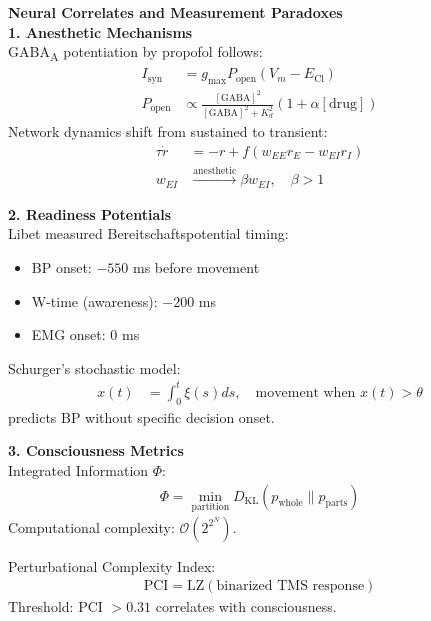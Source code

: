 \begin{technical}
    {\Large\textbf{Neural Correlates and Measurement Paradoxes}}\\[0.7em]

    \textbf{1. Anesthetic Mechanisms}\\[0.3em]
    GABA\textsubscript{A} potentiation by propofol follows:
    \begin{align*}
        I_\text{syn} &= g_\text{max} P_\text{open}(V_m - E_\text{Cl})\\
        P_\text{open} &\propto \frac{[\text{GABA}]^2}{[\text{GABA}]^2 + K_d^2}(1 + \alpha[\text{drug}])
    \end{align*}
    Network dynamics shift from sustained to transient:
    \begin{align*}
        \tau \dot{r} &= -r + f(w_{EE}r_E - w_{EI}r_I)\\
        w_{EI} &\xrightarrow{\text{anesthetic}} \beta w_{EI}, \quad \beta > 1
    \end{align*}

    \textbf{2. Readiness Potentials}\\[0.3em]
    Libet measured Bereitschaftspotential timing:
    \begin{itemize}
        \item BP onset: $-550$ ms before movement
        \item W-time (awareness): $-200$ ms
        \item EMG onset: $0$ ms
    \end{itemize}
    Schurger's stochastic model:
    \begin{align*}
        x(t) &= \int_0^t \xi(s)ds, \quad \text{movement when } x(t) > \theta
    \end{align*}
    predicts BP without specific decision onset.

    \textbf{3. Consciousness Metrics}\\[0.3em]
    Integrated Information $\Phi$:
    \begin{align*}
        \Phi = \min_{\text{partition}} D_\text{KL}(p_\text{whole} \| p_\text{parts})
    \end{align*}
    Computational complexity: $\mathcal{O}(2^{2^N})$.
    
    Perturbational Complexity Index:
    \begin{align*}
        \text{PCI} = \text{LZ}(\text{binarized TMS response})
    \end{align*}
    Threshold: PCI $> 0.31$ correlates with consciousness.


\end{technical}
